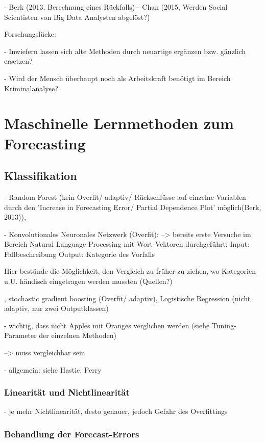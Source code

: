 \documentclass[a4paper,12pt,parskip,bibtotoc,liststotoc]{article}
\begin{document}
- Berk (2013, Berechnung eines Rückfalls)
- Chan (2015, Werden Social Scientisten von Big Data Analysten abgelöst?) 


Forschungslücke: 

- Inwiefern lassen sich alte Methoden durch neuartige ergänzen bzw. gänzlich ersetzen?

- Wird der Mensch überhaupt noch als Arbeitskraft benötigt im Bereich Kriminalanalyse?

\newpage
\section{Maschinelle Lernmethoden zum Forecasting}

\subsection{Klassifikation}

- Random Forest (kein Overfit/ adaptiv/ Rückschlüsse auf einzelne Variablen durch den 'Increase in Forecasting Error/ Partial Dependence Plot' möglich(Berk, 2013)), 

- Konvolutionales Neuronales Netzwerk (Overfit):
--> bereits erste Versuche im Bereich Natural Language Processing mit Wort-Vektoren durchgeführt:
Input: 		Fallbeschreibung
Output: 	Kategorie des Vorfalls

Hier bestünde die Möglichkeit, den Vergleich zu früher zu ziehen, wo Kategorien u.U. händisch eingetragen werden mussten (Quellen?)


, stochastic gradient boosting (Overfit/ adaptiv), Logistische Regression (nicht adaptiv, nur zwei Outputklassen) 

- wichtig, dass nicht Apples mit Oranges verglichen werden (siehe Tuning-Parameter der einzelnen Methoden)

--> muss vergleichbar sein

- allgemein: siehe Hastie, Perry


\subsubsection{Linearität und Nichtlinearität}

- je mehr Nichtlinearität, desto genauer, jedoch Gefahr des Overfittings

\subsubsection{Behandlung der Forecast-Errors}
\end{document}
